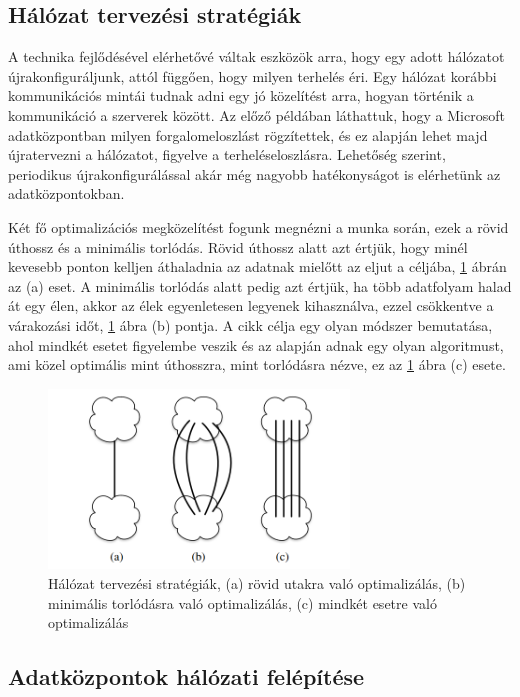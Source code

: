 \documentclass[12pt]{report}
\begin{document}
\subsection{Hálózat tervezési stratégiák}

A technika fejlődésével elérhetővé váltak eszközök arra, hogy egy adott hálózatot újrakonfiguráljunk, attól függően, hogy milyen terhelés éri.
Egy hálózat korábbi kommunikációs mintái tudnak adni egy jó közelítést arra, hogyan történik a kommunikáció a szerverek között.
Az előző példában láthattuk, hogy a Microsoft adatközpontban milyen forgalomeloszlást rögzítettek, 
és ez alapján lehet majd újratervezni a hálózatot, figyelve a terheléseloszlásra.
Lehetőség szerint, periodikus újrakonfigurálással akár még nagyobb hatékonyságot is elérhetünk az adatközpontokban.

Két fő optimalizációs megközelítést fogunk megnézni a munka során, ezek a rövid úthossz és a minimális torlódás.
Rövid úthossz alatt azt értjük, hogy minél kevesebb ponton kelljen áthaladnia az adatnak mielőtt az eljut a céljába, \ref{network_strategies} ábrán az (a) eset.
A minimális torlódás alatt pedig azt értjük, ha több adatfolyam halad át egy élen, akkor az élek egyenletesen legyenek kihasználva, ezzel csökkentve a várakozási időt, \ref{network_strategies} ábra (b) pontja.
A cikk célja egy olyan módszer bemutatása, ahol mindkét esetet figyelembe veszik és az alapján adnak egy olyan algoritmust, ami közel optimális mint úthosszra, mint torlódásra nézve, ez az \ref{network_strategies} ábra (c) esete.


\begin{figure}[h]
	\centering
	\includegraphics[width=8cm]{pictures/optimalshemes.png}
	\caption{Hálózat tervezési stratégiák, (a) rövid utakra való optimalizálás, (b) minimális torlódásra való optimalizálás, (c) mindkét esetre való optimalizálás}
	\label{network_strategies}
\end{figure}

\subsection{Adatközpontok hálózati felépítése}
\end{document}
